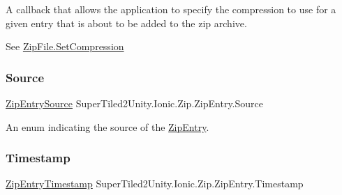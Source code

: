 A callback that allows the application to specify the compression to use for a given entry that is about to be added to the zip archive. 

See \mbox{\hyperlink{class_super_tiled2_unity_1_1_ionic_1_1_zip_1_1_zip_file_abd6bdba1b63a17f284509bbc0fb66637}{Zip\+File.\+Set\+Compression}} \mbox{\label{class_super_tiled2_unity_1_1_ionic_1_1_zip_1_1_zip_entry_a9b8d8fe257d315d4407ad0ae81d98dde}} 
\subsubsection{\texorpdfstring{Source}{Source}}
{\footnotesize\ttfamily \mbox{\hyperlink{namespace_super_tiled2_unity_1_1_ionic_1_1_zip_a9ced5352c56e7e0fceff15b534073c83}{Zip\+Entry\+Source}} Super\+Tiled2\+Unity.\+Ionic.\+Zip.\+Zip\+Entry.\+Source\hspace{0.3cm}{\ttfamily [get]}}



An enum indicating the source of the \mbox{\hyperlink{class_super_tiled2_unity_1_1_ionic_1_1_zip_1_1_zip_entry}{Zip\+Entry}}. 

\mbox{\label{class_super_tiled2_unity_1_1_ionic_1_1_zip_1_1_zip_entry_ab03dc475006c92fb01b760102d508220}} 
\subsubsection{\texorpdfstring{Timestamp}{Timestamp}}
{\footnotesize\ttfamily \mbox{\hyperlink{namespace_super_tiled2_unity_1_1_ionic_1_1_zip_afa5034d6b4915c0633b590a28622f7fd}{Zip\+Entry\+Timestamp}} Super\+Tiled2\+Unity.\+Ionic.\+Zip.\+Zip\+Entry.\+Timestamp\hspace{0.3cm}{\ttfamily [get]}}



